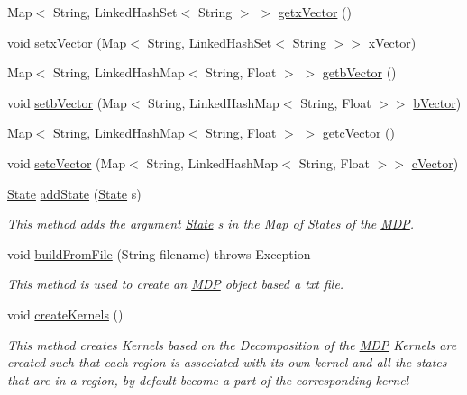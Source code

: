 \begin{DoxyCompactItemize}
Map$<$ String, Linked\+Hash\+Set$<$ String $>$ $>$ \hyperlink{classmdp_1_1core_1_1_m_d_p_a2fc794f6dde7e7425be75ebc82583269}{getx\+Vector} ()
\item 
void \hyperlink{classmdp_1_1core_1_1_m_d_p_ad4063dea06a15a73bc20a1e95b137b83}{setx\+Vector} (Map$<$ String, Linked\+Hash\+Set$<$ String $>$$>$ \hyperlink{classmdp_1_1core_1_1_m_d_p_a073e9c6d6e349ae034c3cf220d754324}{x\+Vector})
\item 
Map$<$ String, Linked\+Hash\+Map$<$ String, Float $>$ $>$ \hyperlink{classmdp_1_1core_1_1_m_d_p_a3564240f2599adfcdf0fdb76b7b4910b}{getb\+Vector} ()
\item 
void \hyperlink{classmdp_1_1core_1_1_m_d_p_a9f49919894e99485e3929642614b5f15}{setb\+Vector} (Map$<$ String, Linked\+Hash\+Map$<$ String, Float $>$$>$ \hyperlink{classmdp_1_1core_1_1_m_d_p_a16eff8bad86554cc9f97f674b1625c66}{b\+Vector})
\item 
Map$<$ String, Linked\+Hash\+Map$<$ String, Float $>$ $>$ \hyperlink{classmdp_1_1core_1_1_m_d_p_a2c2141d2cd5de51e2a35f045b9ebb5da}{getc\+Vector} ()
\item 
void \hyperlink{classmdp_1_1core_1_1_m_d_p_a3b30a91a24ed0db52929343cc4834531}{setc\+Vector} (Map$<$ String, Linked\+Hash\+Map$<$ String, Float $>$$>$ \hyperlink{classmdp_1_1core_1_1_m_d_p_a80af7879a4ff33ac43034eaa934c480f}{c\+Vector})
\item 
\hyperlink{classmdp_1_1core_1_1_state}{State} \hyperlink{classmdp_1_1core_1_1_m_d_p_a0956e730497b8c93b09675990a75f283}{add\+State} (\hyperlink{classmdp_1_1core_1_1_state}{State} s)
\begin{DoxyCompactList}\small\item\em This method adds the argument \hyperlink{classmdp_1_1core_1_1_state}{State} s in the Map of States of the \hyperlink{classmdp_1_1core_1_1_m_d_p}{M\+D\+P}. \end{DoxyCompactList}\item 
void \hyperlink{classmdp_1_1core_1_1_m_d_p_a0565cd0a84c836dd11ba0d13e1eb5ffb}{build\+From\+File} (String filename)  throws Exception 	
\begin{DoxyCompactList}\small\item\em This method is used to create an \hyperlink{classmdp_1_1core_1_1_m_d_p}{M\+D\+P} object based a txt file. \end{DoxyCompactList}\item 
void \hyperlink{classmdp_1_1core_1_1_m_d_p_aa3d7c9f10aff03c993322d3ff7129dfb}{create\+Kernels} ()
\begin{DoxyCompactList}\small\item\em This method creates Kernels based on the Decomposition of the \hyperlink{classmdp_1_1core_1_1_m_d_p}{M\+D\+P} Kernels are created such that each region is associated with its own kernel and all the states that are in a region, by default become a part of the corresponding kernel~\newline

\end{DoxyCompactList}$$
\end{DoxyCompactItemize}
